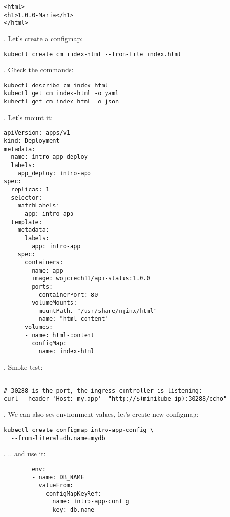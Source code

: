 \documentclass[12pt, letterpaper]{article}
\begin{document}
\begin{verbatim}
<html>
<h1>1.0.0-Maria</h1>
</html>
\end{verbatim}

. Let's create a configmap:

\begin{verbatim}
kubectl create cm index-html --from-file index.html
\end{verbatim}

. Check the commands:

\begin{verbatim}
kubectl describe cm index-html
kubectl get cm index-html -o yaml
kubectl get cm index-html -o json
\end{verbatim}

. Let's mount it:

\begin{verbatim}
apiVersion: apps/v1
kind: Deployment
metadata:
  name: intro-app-deploy
  labels:
    app_deploy: intro-app
spec:
  replicas: 1
  selector:
    matchLabels:
      app: intro-app
  template:
    metadata:
      labels:
        app: intro-app
    spec:
      containers:
      - name: app
        image: wojciech11/api-status:1.0.0
        ports:
        - containerPort: 80
        volumeMounts:
        - mountPath: "/usr/share/nginx/html"
          name: "html-content"
      volumes:
      - name: html-content
        configMap:
          name: index-html
\end{verbatim}

. Smoke test:

\begin{verbatim}

# 30288 is the port, the ingress-controller is listening:
curl --header 'Host: my.app'  "http://$(minikube ip):30288/echo"
\end{verbatim}

. We can also set environment values, let's create new configmap:

\begin{verbatim}
kubectl create configmap intro-app-config \
  --from-literal=db.name=mydb
\end{verbatim}

. .. and use it:

\begin{verbatim}
        env:
        - name: DB_NAME
          valueFrom:
            configMapKeyRef:
              name: intro-app-config
              key: db.name
\end{verbatim}
\end{document}
